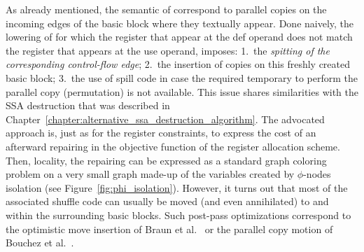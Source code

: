 {%
As already mentioned, the semantic of \phifuns correspond to parallel copies on the incoming edges of the basic block where they textually appear.
Done naively, the lowering of \phifuns for which the register that appear at the def operand does not match the register that appears at the use operand, imposes:
1.~the \emph{spitting of the corresponding control-flow edge};
2.~the insertion of copies on this freshly created basic block;
3.~the use of spill code in case the required temporary to perform the parallel copy (permutation) is not available.
This issue shares similarities with the SSA destruction that was described in Chapter~\ref{chapter:alternative_ssa_destruction_algorithm}.
The advocated approach is, just as for the register constraints, to express the cost of an afterward repairing in the objective function of the register allocation scheme.
Then, locality, the repairing can be expressed as a standard graph coloring problem on a very small graph made-up of the variables created by $\phi$-nodes isolation (see Figure~\ref{fig:phi_isolation}).
However, it turns out that most of the associated shuffle code can usually be moved (and even annihilated) to and within the surrounding basic blocks.
Such post-pass optimizations correspond to the optimistic move insertion of Braun et al.~\cite{braun2010preference} or the parallel copy motion of Bouchez et al.~\cite{Bouchez:2010:PCM}.

}
